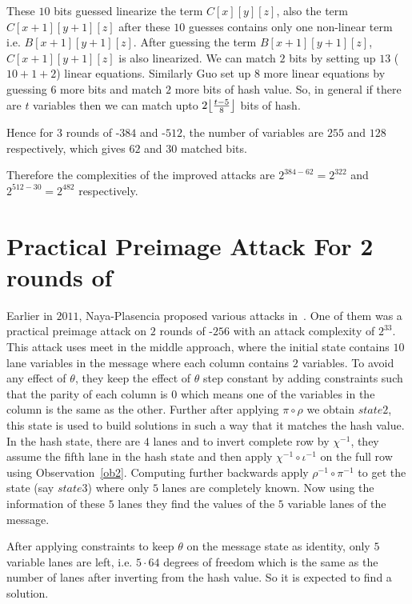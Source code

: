         These $10$ bits guessed linearize the term $C[x][y][z]$, also the term $C[x+1][y+1][z]$ after these $10$ guesses contains only one non-linear term i.e. $B[x+1][y+1][z]$. After guessing the term $B[x+1][y+1][z]$, $C[x+1][y+1][z]$ is also linearized. We can match $2$ bits by setting up $13$ ($10 + 1 + 2$) linear equations. Similarly Guo \etal set up $8$ more linear equations by guessing $6$ more bits and match $2$ more bits of hash value. So, in general if there are $t$ variables then we can match upto $ 2\floor*{\frac{t-5}{8}}$ bits of hash.

        Hence for $3$ rounds of \KECCAK-$384$ and \KECCAK-$512$, the number of variables are $255$ and $128$ respectively, which gives $62$ and $30$ matched bits.
        
        Therefore the complexities of the improved attacks are $2^{384 - 62} = 2^{322}$ and $2^{512 - 30} = 2^{482}$ respectively.

\section{Practical Preimage Attack For 2 rounds of }

Earlier in $2011$, Naya-Plasencia \etal proposed various attacks in~\cite{naya2011practical}. One of them was a practical preimage attack on $2$ rounds of \KECCAK-$256$ with an attack complexity of $2^{33}$. This attack uses meet in the middle approach, where the initial state contains $10$ lane variables in the message where each column contains $2$ variables. To avoid any effect of $\theta$, they keep the effect of $\theta$ step constant by adding constraints such that the parity of each column is $0$ which means one of the variables in the column is the same as the other. Further after applying $\pi \circ \rho$ we obtain $state2$, this state is used to build solutions in such a way that it matches the hash value. In the hash state, there are $4$ lanes and to invert complete row by $\chi^{-1}$, they assume the fifth lane in the hash state and then apply $\chi^{-1} \circ \iota^{-1}$ on the full row using Observation~\ref{ob2}. Computing further backwards apply $\rho^{-1} \circ \pi^{-1}$ to get the state (say $state3$) where only $5$ lanes are completely known. Now using the information of these $5$ lanes they find the values of the $5$ variable lanes of the message.

After applying constraints to keep $\theta$ on the message state as identity,  only $5$ variable lanes are left, i.e. $5 \cdot 64$ degrees of freedom which is the same as the number of lanes after inverting from the hash value. So it is expected to find a solution.

